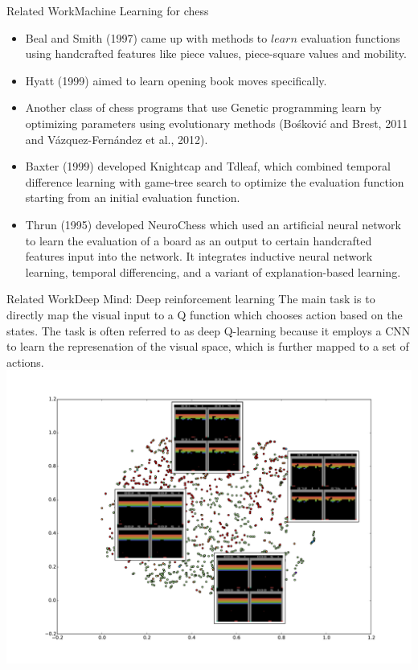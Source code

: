 \documentclass[9pt, unknownkeysallowed]{beamer}
\begin{document}
\begin{frame}{Related Work}{Machine Learning for chess}
 \begin{itemize}[<+->]
  \item Beal and Smith (1997) came up with methods to $learn$ evaluation functions using handcrafted features like piece values, piece-square values and mobility.
  \item Hyatt (1999) aimed to learn opening book moves specifically.
  \item Another class of chess programs that use Genetic programming learn by optimizing parameters using evolutionary methods (Bo\'skovi\'c and Brest, 2011 and V\'azquez-Fern\'andez et al., 2012).
  \item Baxter (1999) developed Knightcap and Tdleaf, which combined temporal difference learning with game-tree search to optimize the evaluation function starting from an initial evaluation function.
  \item Thrun (1995) developed NeuroChess which used an artificial neural network to learn the evaluation of a board as an output to certain handcrafted features input into the network. It integrates inductive neural network learning, temporal differencing, and a variant of explanation-based learning.  
 \end{itemize}

\end{frame}

\begin{frame}{Related Work}{Deep Mind: Deep reinforcement learning}
The main task is to directly map the visual input to a Q function which chooses action based on the states. The task is often referred to as deep Q-learning because it employs a CNN to learn the represenation of the visual space, which is further mapped to a set of actions.
\includegraphics[width=1\textwidth]{../plots/tsne_breakout_new3_big.pdf}

\end{frame}
\end{document}
